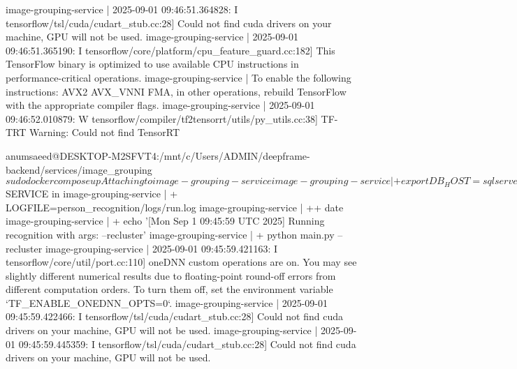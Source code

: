 image-grouping-service  | 2025-09-01 09:46:51.364828: I tensorflow/tsl/cuda/cudart_stub.cc:28] Could not find cuda drivers on your machine, GPU will not be used.
image-grouping-service  | 2025-09-01 09:46:51.365190: I tensorflow/core/platform/cpu_feature_guard.cc:182] This TensorFlow binary is optimized to use available CPU instructions in performance-critical operations.
image-grouping-service  | To enable the following instructions: AVX2 AVX_VNNI FMA, in other operations, rebuild TensorFlow with the appropriate compiler flags.
image-grouping-service  | 2025-09-01 09:46:52.010879: W tensorflow/compiler/tf2tensorrt/utils/py_utils.cc:38] TF-TRT Warning: Could not find TensorRT



anumsaeed@DESKTOP-M2SFVT4:/mnt/c/Users/ADMIN/deepframe-backend/services/image_grouping$ sudo docker compose up
Attaching to image-grouping-service
image-grouping-service  | + export DB_HOST=sqlserver
image-grouping-service  | + DB_HOST=sqlserver
image-grouping-service  | + export DB_PORT=1433
image-grouping-service  | + DB_PORT=1433
image-grouping-service  | + export DB_USER=sa
image-grouping-service  | + DB_USER=sa
image-grouping-service  | + export DB_PASSWORD=YourStrong@Passw0rd
image-grouping-service  | + DB_PASSWORD=YourStrong@Passw0rd
image-grouping-service  | + export DB_NAME=MediaDB
image-grouping-service  | + DB_NAME=MediaDB
image-grouping-service  | + SERVICE=recognition
image-grouping-service  | + MODE=oneshot
image-grouping-service  | + INTERVAL_SECONDS=900
image-grouping-service  | + RECOGNIZER_ARGS=--recluster
image-grouping-service  | + mkdir -p person_recognition/logs image_face_detection/logs
image-grouping-service  | + '[' oneshot = loop ']'
image-grouping-service  | + run_service
image-grouping-service  | + case $SERVICE in
image-grouping-service  | + LOGFILE=person_recognition/logs/run.log
image-grouping-service  | ++ date
image-grouping-service  | + echo '[Mon Sep  1 09:45:59 UTC 2025] Running recognition with args: --recluster'
image-grouping-service  | + python main.py --recluster
image-grouping-service  | 2025-09-01 09:45:59.421163: I tensorflow/core/util/port.cc:110] oneDNN custom operations are on. You may see slightly different numerical results due to floating-point round-off errors from different computation orders. To turn them off, set the environment variable `TF_ENABLE_ONEDNN_OPTS=0`.
image-grouping-service  | 2025-09-01 09:45:59.422466: I tensorflow/tsl/cuda/cudart_stub.cc:28] Could not find cuda drivers on your machine, GPU will not be used.
image-grouping-service  | 2025-09-01 09:45:59.445359: I tensorflow/tsl/cuda/cudart_stub.cc:28] Could not find cuda drivers on your machine, GPU will not be used.
